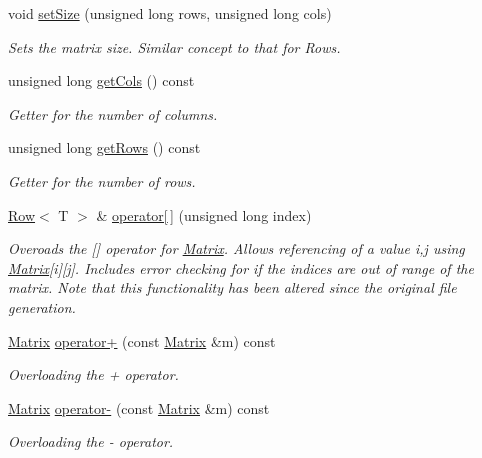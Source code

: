 \begin{DoxyCompactItemize}
\item 
void \hyperlink{class_matrix_aa393296d4132d7aafc4e236ddfe59f06}{set\+Size} (unsigned long rows, unsigned long cols)
\begin{DoxyCompactList}\small\item\em Sets the matrix size. Similar concept to that for Rows. \end{DoxyCompactList}\item 
unsigned long \hyperlink{class_matrix_a9b4ce445c65dcea66c66dda875cc39d8}{get\+Cols} () const 
\begin{DoxyCompactList}\small\item\em Getter for the number of columns. \end{DoxyCompactList}\item 
unsigned long \hyperlink{class_matrix_a442879db6473eeab202928dc47992206}{get\+Rows} () const 
\begin{DoxyCompactList}\small\item\em Getter for the number of rows. \end{DoxyCompactList}\item 
\hyperlink{class_row}{Row}$<$ T $>$ \& \hyperlink{class_matrix_ae7e14b4bd8bb570260a4e578e4a601b7}{operator\mbox{[}$\,$\mbox{]}} (unsigned long index)
\begin{DoxyCompactList}\small\item\em Overoads the \mbox{[}\mbox{]} operator for \hyperlink{class_matrix}{Matrix}. Allows referencing of a value i,j using \hyperlink{class_matrix}{Matrix}\mbox{[}i\mbox{]}\mbox{[}j\mbox{]}. Includes error checking for if the indices are out of range of the matrix. Note that this functionality has been altered since the original file generation. \end{DoxyCompactList}\item 
\hyperlink{class_matrix}{Matrix} \hyperlink{class_matrix_abdbd1bbdae2f6926cdc2b58faa304826}{operator+} (const \hyperlink{class_matrix}{Matrix} \&m) const 
\begin{DoxyCompactList}\small\item\em Overloading the + operator. \end{DoxyCompactList}\item 
\hyperlink{class_matrix}{Matrix} \hyperlink{class_matrix_a73b8da7142ea2593ba7d097651a3ce5c}{operator-\/} (const \hyperlink{class_matrix}{Matrix} \&m) const 
\begin{DoxyCompactList}\small\item\em Overloading the -\/ operator. \end{DoxyCompactList}\item 

\end{DoxyCompactItemize}
